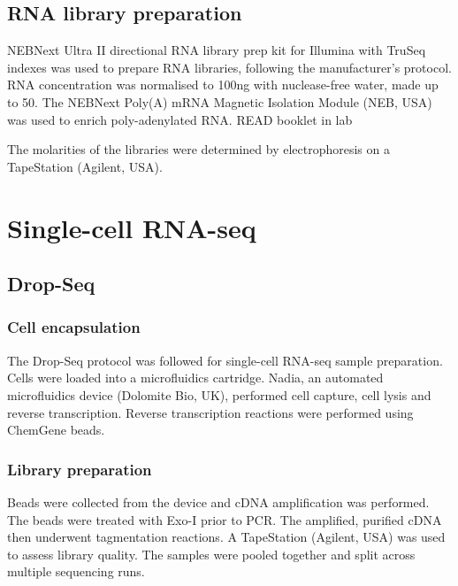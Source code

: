 \subsection{RNA library preparation}
NEBNext\textsuperscript{\textregistered} Ultra II directional RNA library prep kit for Illumina\textsuperscript{\textregistered} with TruSeq indexes was used to prepare RNA libraries, following the manufacturer's protocol.
RNA concentration was normalised to 100\si{\ng} with nuclease-free water, made up to 50\ul{}.
The NEBNext Poly(A) mRNA Magnetic Isolation Module (NEB, USA) was used to enrich poly-adenylated RNA. READ booklet in lab


The molarities of the libraries were determined by electrophoresis on a TapeStation (Agilent, USA).

\section{Single-cell RNA-seq}
\subsection{Drop-Seq}

\subsubsection{Cell encapsulation}
The Drop-Seq protocol\cite{macosko2015highly} was followed for single-cell RNA-seq sample preparation.
Cells were loaded into a microfluidics cartridge.
Nadia, an automated microfluidics device (Dolomite Bio, UK), performed cell capture, cell lysis and reverse transcription.
Reverse transcription reactions were performed using ChemGene beads.

\subsubsection{Library preparation}
Beads were collected from the device and cDNA amplification was performed.
The beads were treated with Exo-I prior to PCR.
The amplified, purified cDNA then underwent tagmentation reactions.
A TapeStation (Agilent, USA) was used to assess library quality.
The samples were pooled together and split across multiple sequencing runs.

